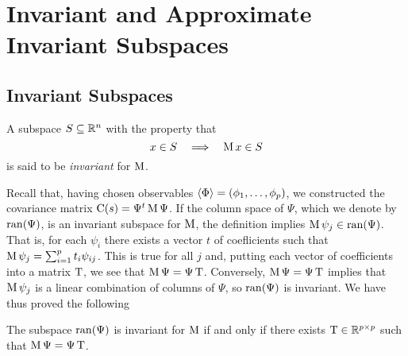 \chapter{Invariant and Approximate Invariant Subspaces}

\section{Invariant Subspaces}

\begin{definition}
A subspace $S \subseteq \mathbb{R}^n$ with the property that
\[
x \in S \quad \Longrightarrow \quad \operatorname{M} x \in S
\]
is said to be \emph{invariant} for $\operatorname{M}$.
\end{definition}

Recall that, having chosen observables $\langle\Phi\rangle = (\phi_1, \dots, \phi_p)$, we
constructed the covariance matrix 
$\operatorname{C}(s) = \Psi^t \operatorname{M} \Psi$. 
If the column space of $\Psi$, which we denote by $\operatorname{ran}(\Psi)$, is an invariant
subspace for $\operatorname{M}$, the definition implies $\operatorname{M}\psi_j \in \operatorname{ran}(\Psi)$.
That is, for each $\psi_i$ there exists a vector
$t$ of coeﬂicients such that $\operatorname{M} \psi_j = \sum_{i=1}^p t_i \psi_{ij}$. 
This is true for all $j$ and, putting each vector of
coefficients into a matrix $\operatorname{T}$, we see that 
$\operatorname{M} \Psi = \Psi \operatorname{T}$. Conversely, $\operatorname{M}\Psi = \Psi \operatorname{T}$ implies that $\operatorname{M}\psi_j$ is a
linear combination of columns of $\Psi$, so $\operatorname{ran}(\Psi)$ is invariant. We have
thus proved the following 
\begin{fact}
\label{fact:3.1.1}
The subspace $\operatorname{ran}(\Psi)$ is invariant for $\operatorname{M}$ if and only if there exists 
$\operatorname{T} \in \mathbb{R}^{p\times p}$ such that $\operatorname{M}\Psi = \Psi \operatorname{T}$.
\end{fact}

